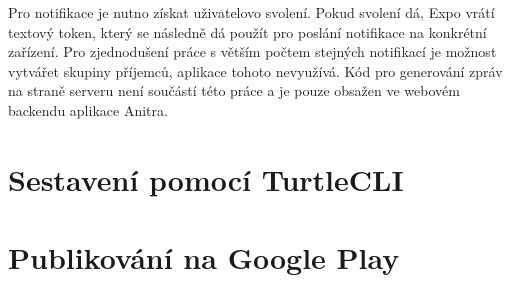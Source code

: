 Pro notifikace je nutno získat uživatelovo svolení. Pokud svolení dá, Expo vrátí textový token, který se následně dá použít pro poslání notifikace na konkrétní zařízení. Pro zjednodušení práce s větším počtem stejných notifikací je možnost vytvářet skupiny příjemců, aplikace tohoto nevyužívá. Kód pro generování zpráv na straně serveru není součástí této práce a je pouze obsažen ve webovém backendu aplikace Anitra.

\section{Sestavení pomocí TurtleCLI}

\section{Publikování na Google Play}